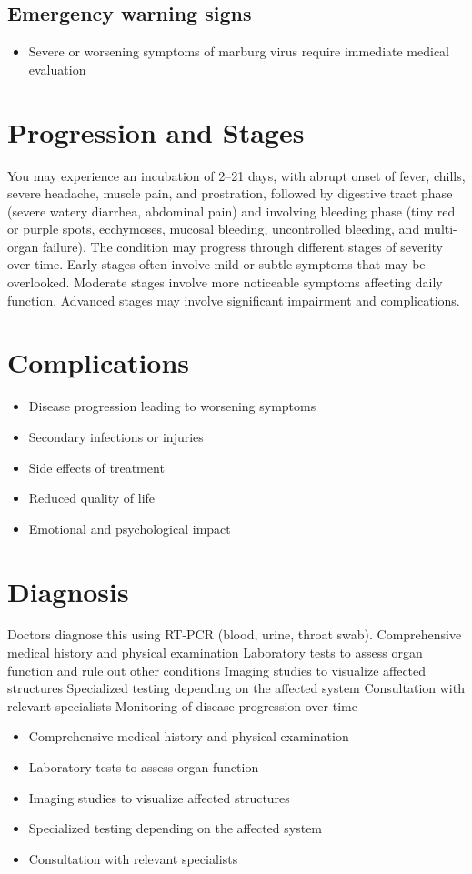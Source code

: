 \subsection{Emergency warning signs}
\begin{itemize}[noitemsep]
  \item Severe or worsening symptoms of marburg virus require immediate medical evaluation
\end{itemize}
\section{Progression and Stages}
You may experience an incubation of 2--21 days, with abrupt onset of fever, chills, severe headache, muscle pain, and prostration, followed by digestive tract phase (severe watery diarrhea, abdominal pain) and involving bleeding phase (tiny red or purple spots, ecchymoses, mucosal bleeding, uncontrolled bleeding, and multi-organ failure). The condition may progress through different stages of severity over time. Early stages often involve mild or subtle symptoms that may be overlooked. Moderate stages involve more noticeable symptoms affecting daily function. Advanced stages may involve significant impairment and complications.
\section{Complications}
\begin{itemize}[noitemsep]
  \item Disease progression leading to worsening symptoms
  \item Secondary infections or injuries
  \item Side effects of treatment
  \item Reduced quality of life
  \item Emotional and psychological impact
\end{itemize}
\section{Diagnosis}
Doctors diagnose this using RT-PCR (blood, urine, throat swab). Comprehensive medical history and physical examination Laboratory tests to assess organ function and rule out other conditions Imaging studies to visualize affected structures Specialized testing depending on the affected system Consultation with relevant specialists Monitoring of disease progression over time

\begin{itemize}[noitemsep]
  \item Comprehensive medical history and physical examination
  \item Laboratory tests to assess organ function
  \item Imaging studies to visualize affected structures
  \item Specialized testing depending on the affected system
  \item Consultation with relevant specialists
\end{itemize}
